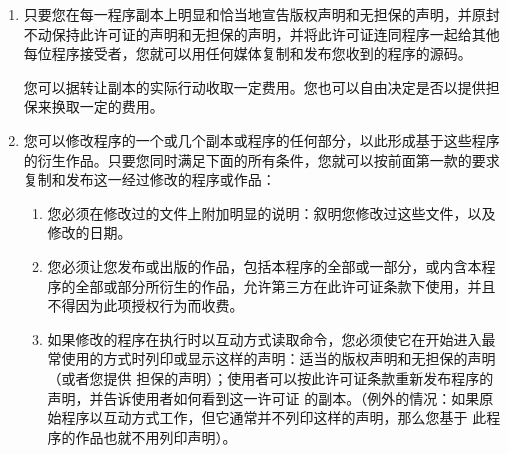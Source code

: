 \begin{enumerate}
    \item 只要您在每一程序副本上明显和恰当地宣告版权声明和无担保的声明，并原封不动保持此许可证的声明和无担保的声明，并将此许可证连同程序一起给其他每位程序接受者，您就可以用任何媒体复制和发布您收到的程序的源码。

        您可以据转让副本的实际行动收取一定费用。您也可以自由决定是否以提供担保来换取一定的费用。

    \item 您可以修改程序的一个或几个副本或程序的任何部分，以此形成基于这些程序的衍生作品。只要您同时满足下面的所有条件，您就可以按前面第一款的要求复制和发布这一经过修改的程序或作品：
        \begin{enumerate}
            \item 您必须在修改过的文件上附加明显的说明：叙明您修改过这些文件，以及修改的日期。
            \item 您必须让您发布或出版的作品，包括本程序的全部或一部分，或内含本程序的全部或部分所衍生的作品，允许第三方在此许可证条款下使用，并且不得因为此项授权行为而收费。
            \item 如果修改的程序在执行时以互动方式读取命令，您必须使它在开始进入最常使用的方式时列印或显示这样的声明：适当的版权声明和无担保的声明（或者您提供 担保的声明）；使用者可以按此许可证条款重新发布程序的声明，并告诉使用者如何看到这一许可证 的副本。（例外的情况：如果原始程序以互动方式工作，但它通常并不列印这样的声明，那么您基于 此程序的作品也就不用列印声明）。

\end{enumerate}
\end{enumerate}
